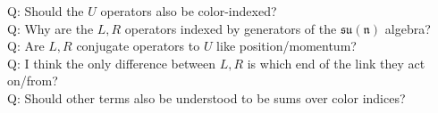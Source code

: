\documentclass[11pt,reqno]{amsart}
\begin{document}
	\noindent Q: Should the $U$ operators also be color-indexed?\\
	Q: Why are the $L,R$ operators indexed by generators of the $\mathfrak{su(n)}$ algebra?\\
	Q: Are $L,R$ conjugate operators to $U$ like position/momentum?\\
	Q: I think the only difference between $L,R$ is which end of the link they act on/from?\\
	Q: Should other terms also be understood to be sums over color indices? 
	
	
	
	\nocite{Hamer82}
\end{document}
